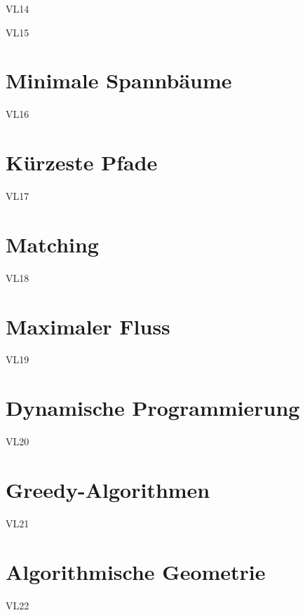 \documentclass[12pt]{article}
\begin{document}
VL14

VL15

\section{Minimale Spannbäume}

VL16

\section{Kürzeste Pfade}

VL17

\section{Matching}

VL18

\section{Maximaler Fluss}

VL19

\section{Dynamische Programmierung}

VL20

\section{Greedy-Algorithmen}

VL21

\section{Algorithmische Geometrie}

VL22
\end{document}
